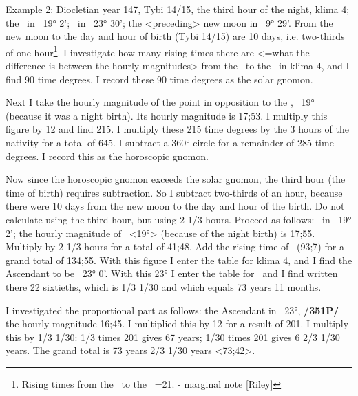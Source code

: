 Example 2: Diocletian year 147, Tybi 14/15, the third hour of the night, klima 4; the \Sun\, in \Capricorn\, 19° 2'; \Moon\, in \Taurus\, 23° 30'; the <preceding> new moon in \Capricorn\, 9° 29'. From the new moon to the day and hour of birth (Tybi 14/15) are 10 days, i.e. two-thirds of one hour\footnote{Rising times from the \Sun\, to the \Moon\, =21. - marginal note [Riley]}. I investigate how many rising times there are <=what the difference is between the hourly magnitudes> from the \Sun\, to the \Moon\, in klima 4, and I find 90 time degrees. I record these 90 time degrees as the solar gnomon. 

Next I take the hourly magnitude of the point in opposition to the \Sun, \Cancer\, 19° (because it was a night birth). Its hourly magnitude is 17;53. I multiply this figure by 12 and find 215. I multiply these 215 time degrees by the 3 hours of the nativity for a total of 645. I subtract a 360° circle for a remainder of 285 time degrees. I record this as the horoscopic gnomon. 

Now since the horoscopic gnomon exceeds the solar gnomon, the
third hour (the time of birth) requires subtraction. So I subtract two-thirds of an hour, because there were 10 days from the new moon to the day and hour of the birth. Do not calculate using the third hour, but
using 2 1/3 hours. Proceed as follows: \Sun\, in \Capricorn\, 19° 2'; the hourly magnitude of \Cancer\, <19°> (because of the night birth) is 17;55. Multiply by 2 1/3 hours for a total of 41;48. Add the rising time of \Cancer\, (93;7) for a grand total of 134;55. With this figure I enter the table for klima 4, and I find the Ascendant to be \Leo\, 23° 0'. With this 23° I enter the table for \Leo\, and I find written there 22 sixtieths, which is 1/3 1/30 and which equals 73 years 11 months. 

I investigated the proportional part as follows: the Ascendant in \Leo\, 23°, \textbf{/351P/} the hourly magnitude 16;45. I multiplied this by 12 for a result of 201. I multiply this by 1/3 1/30: 1/3 times 201 gives 67 years; 1/30 times 201 gives 6 2/3 1/30 years. The
grand total is 73 years 2/3 1/30 years <73;42>.

